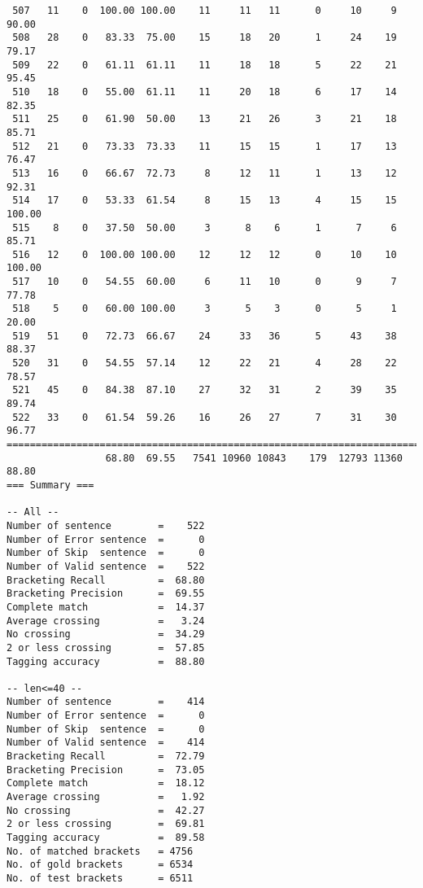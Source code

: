 \begin{verbatim}
 507   11    0  100.00 100.00    11     11   11      0     10     9    90.00
 508   28    0   83.33  75.00    15     18   20      1     24    19    79.17
 509   22    0   61.11  61.11    11     18   18      5     22    21    95.45
 510   18    0   55.00  61.11    11     20   18      6     17    14    82.35
 511   25    0   61.90  50.00    13     21   26      3     21    18    85.71
 512   21    0   73.33  73.33    11     15   15      1     17    13    76.47
 513   16    0   66.67  72.73     8     12   11      1     13    12    92.31
 514   17    0   53.33  61.54     8     15   13      4     15    15   100.00
 515    8    0   37.50  50.00     3      8    6      1      7     6    85.71
 516   12    0  100.00 100.00    12     12   12      0     10    10   100.00
 517   10    0   54.55  60.00     6     11   10      0      9     7    77.78
 518    5    0   60.00 100.00     3      5    3      0      5     1    20.00
 519   51    0   72.73  66.67    24     33   36      5     43    38    88.37
 520   31    0   54.55  57.14    12     22   21      4     28    22    78.57
 521   45    0   84.38  87.10    27     32   31      2     39    35    89.74
 522   33    0   61.54  59.26    16     26   27      7     31    30    96.77
============================================================================
                 68.80  69.55   7541 10960 10843    179  12793 11360    88.80
=== Summary ===

-- All --
Number of sentence        =    522
Number of Error sentence  =      0
Number of Skip  sentence  =      0
Number of Valid sentence  =    522
Bracketing Recall         =  68.80
Bracketing Precision      =  69.55
Complete match            =  14.37
Average crossing          =   3.24
No crossing               =  34.29
2 or less crossing        =  57.85
Tagging accuracy          =  88.80

-- len<=40 --
Number of sentence        =    414
Number of Error sentence  =      0
Number of Skip  sentence  =      0
Number of Valid sentence  =    414
Bracketing Recall         =  72.79
Bracketing Precision      =  73.05
Complete match            =  18.12
Average crossing          =   1.92
No crossing               =  42.27
2 or less crossing        =  69.81
Tagging accuracy          =  89.58
No. of matched brackets   = 4756
No. of gold brackets      = 6534
No. of test brackets      = 6511

\end{verbatim}

\normalsize

